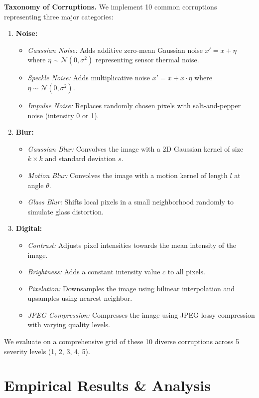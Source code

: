 \documentclass{article}
\theoremstyle{plain}
\theoremstyle{definition}
\theoremstyle{remark}
\begin{document}
\textbf{Taxonomy of Corruptions.} We implement 10 common corruptions representing three major categories:
\begin{enumerate}
    \item \textbf{Noise:}
    \begin{itemize}
        \item \textit{Gaussian Noise:} Adds additive zero-mean Gaussian noise $x' = x + \eta$ where $\eta \sim \mathcal{N}(0, \sigma^2)$ representing sensor thermal noise.
        \item \textit{Speckle Noise:} Adds multiplicative noise $x' = x + x \cdot \eta$ where $\eta \sim \mathcal{N}(0, \sigma^2)$.
        \item \textit{Impulse Noise:} Replaces randomly chosen pixels with salt-and-pepper noise (intensity 0 or 1).
    \end{itemize}
    \item \textbf{Blur:}
    \begin{itemize}
        \item \textit{Gaussian Blur:} Convolves the image with a 2D Gaussian kernel of size $k \times k$ and standard deviation $s$.
        \item \textit{Motion Blur:} Convolves the image with a motion kernel of length $l$ at angle $\theta$.
        \item \textit{Glass Blur:} Shifts local pixels in a small neighborhood randomly to simulate glass distortion.
    \end{itemize}
    \item \textbf{Digital:}
    \begin{itemize}
        \item \textit{Contrast:} Adjusts pixel intensities towards the mean intensity of the image.
        \item \textit{Brightness:} Adds a constant intensity value $c$ to all pixels.
        \item \textit{Pixelation:} Downsamples the image using bilinear interpolation and upsamples using nearest-neighbor.
        \item \textit{JPEG Compression:} Compresses the image using JPEG lossy compression with varying quality levels.
    \end{itemize}
\end{enumerate}
We evaluate on a comprehensive grid of these 10 diverse corruptions across 5 severity levels (1, 2, 3, 4, 5).

\section{Empirical Results \& Analysis}
\label{sec:results}
\end{document}
